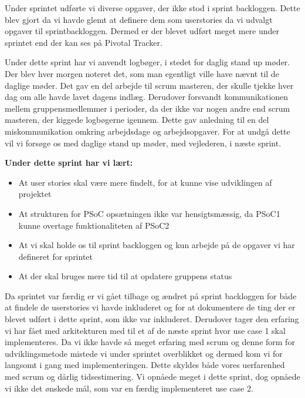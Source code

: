 	Under sprintet udførte vi diverse opgaver, der ikke stod i sprint backloggen. Dette blev gjort da vi havde glemt at definere dem som userstories da vi udvalgt opgaver til sprintbackloggen. Dermed er der blevet udført meget mere under sprintet end der kan ses på Pivotal Tracker. \newline
	
	Under dette sprint har vi anvendt logbøger, i stedet for daglig stand up møder. Der blev hver morgen noteret det, som man egentligt ville have nævnt til de daglige møder. Det gav en del arbejde til scrum masteren, der skulle tjekke hver dag om alle havde lavet dagens indlæg. Derudover forsvandt kommunikationen mellem gruppensmedlemmer i perioder, da der ikke var nogen andre end scrum masteren, der kiggede logbøgerne igennem. Dette gav anledning til en del miskommunikation omkring arbejdsdage og arbejdsopgaver. For at undgå dette vil vi forsøge os med daglige stand up møder, med vejlederen, i næste sprint. \newline
	
	\textbf{Under dette sprint har vi lært:}
	\begin{itemize}
		\item At user stories skal være mere findelt, for at kunne vise udviklingen af projektet
		\item At strukturen for PSoC opsætningen ikke var hensigtsmæssig, da PSoC1 kunne overtage funktionaliteten af PSoC2
		\item At vi skal holde os til sprint backloggen og kun arbejde på de opgaver vi har defineret for sprintet
		\item At der skal bruges mere tid til at opdatere gruppens status
	\end{itemize}
	
	Da sprintet var færdig er vi gået tilbage og ændret på sprint backloggen for både at findele de userstories vi havde inkluderet og for at dokumentere de ting der er blevet udført i dette sprint, som ikke var inkluderet. Derudover tager den erfaring vi har fået med arkitekturen med til et af de næste sprint hvor use case 1 skal implementeres. Da vi ikke havde så meget erfaring med scrum og denne form for udviklingsmetode mistede vi under sprintet overblikket og dermed kom vi for langsomt i gang med implementeringen. Dette skyldes både vores uerfarenhed med scrum og dårlig tidsestimering. Vi opnåede meget i dette sprint, dog opnåede vi ikke det ønskede mål, som var en færdig implementeret use case 2. 
	
	
	
